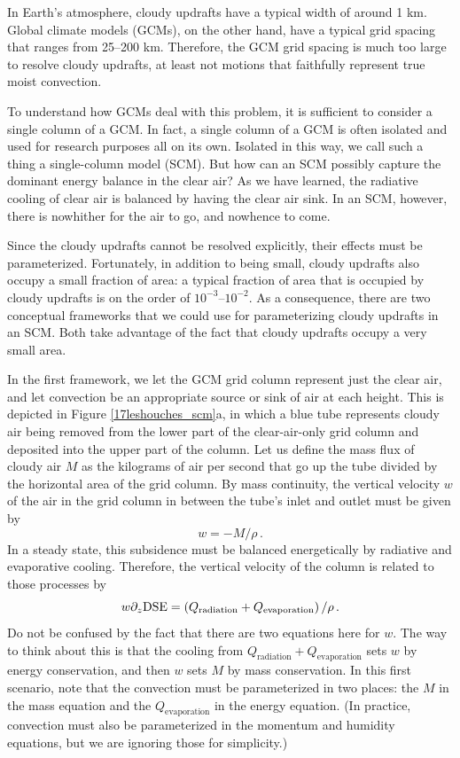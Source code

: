 \documentclass[12pt]{article}
\newcommand{\dse}{{\text{DSE}}}
\begin{document}
In Earth's atmosphere, cloudy updrafts have a typical width of around 1 km.  Global climate models (GCMs), on the other hand, have a typical grid spacing that ranges from 25--200 km.  Therefore, the GCM grid spacing is much too large to resolve cloudy updrafts, at least not motions that faithfully represent true moist convection.


To understand how GCMs deal with this problem, it is sufficient to consider a single column of a GCM.  In fact, a single column of a GCM is often isolated and used for research purposes all on its own.  Isolated in this way, we call such a thing a single-column model (SCM).  But how can an SCM possibly capture the dominant energy balance in the clear air?  As we have learned, the radiative cooling of clear air is balanced by having the clear air sink.  In an SCM, however, there is nowhither for the air to go, and nowhence to come.


Since the cloudy updrafts cannot be resolved explicitly, their effects must be parameterized.  Fortunately, in addition to being small, cloudy updrafts also occupy a small fraction of area: a typical fraction of area that is occupied by cloudy updrafts is on the order of $10^{-3}$--$10^{-2}$.  As a consequence, there are two conceptual frameworks that we could use for parameterizing cloudy updrafts in an SCM.  Both take advantage of the fact that cloudy updrafts occupy a very small area.


In the first framework, we let the GCM grid column represent just the clear air, and let convection be an appropriate source or sink of air at each height.  This is depicted in Figure \ref{17leshouches_scm}a, in which a blue tube represents cloudy air being removed from the lower part of the clear-air-only grid column and deposited into the upper part of the column.  Let us define the mass flux of cloudy air $M$ as the kilograms of air per second that go up the tube divided by the horizontal area of the grid column.  By mass continuity, the vertical velocity $w$ of the air in the grid column in between the tube's inlet and outlet must be given by
\begin{equation}
w = - M/\rho \, . \label{framework1_mass}
\end{equation}
In a steady state, this subsidence must be balanced energetically by radiative and evaporative cooling.  Therefore, the vertical velocity of the column is related to those processes by
\begin{equation}
w \ppz \dse = \left( Q_{\text{radiation}} + Q_{\text{evaporation}} \right) / \rho \, . \label{framework1_energy}
\end{equation}
Do not be confused by the fact that there are two equations here for $w$.  The way to think about this is that the cooling from $Q_{\text{radiation}} + Q_{\text{evaporation}}$ sets $w$ by energy conservation, and then $w$ sets $M$ by mass conservation.  In this first scenario, note that the convection must be parameterized in two places: the $M$ in the mass equation and the $Q_{\text{evaporation}}$ in the energy equation.  (In practice, convection must also be parameterized in the momentum and humidity equations, but we are ignoring those for simplicity.)
\end{document}
